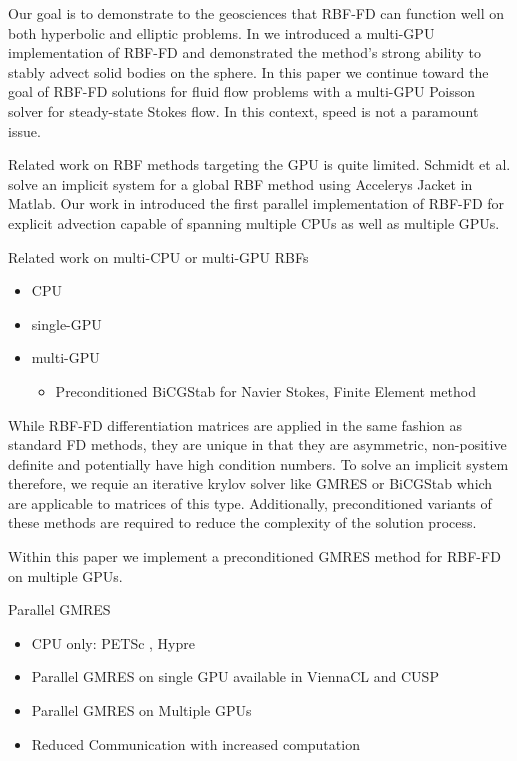 Our goal is to demonstrate to the geosciences that RBF-FD can function well on
both hyperbolic and elliptic problems. In \cite{BolligFlyerErlebacher2012} we
introduced a multi-GPU implementation of RBF-FD and demonstrated the method's
strong ability to stably advect solid bodies on the sphere. In this paper we
continue toward the goal of RBF-FD solutions for fluid flow problems with a
multi-GPU Poisson solver for steady-state Stokes flow. In this context, speed is
not a paramount issue.

Related work on RBF methods targeting the GPU is quite limited. Schmidt et al.
\cite{Schmidt2009b} solve an implicit system for a global RBF method using
Accelerys Jacket in Matlab. Our work in \cite{BolligFlyerErlebacher2012} introduced the first
parallel implementation of RBF-FD for explicit advection capable of spanning
multiple CPUs as well as multiple GPUs. 

Related work on multi-CPU or multi-GPU RBFs
\begin{itemize} 
	\item CPU \cite{Yokota2010} \cite{Wildemann2009}
	\item single-GPU \cite{Schmidt2009b}
	\item multi-GPU 
	\begin{itemize} 
	\item Preconditioned BiCGStab for Navier Stokes, Finite Element method \cite{Goeddeke2009a} 
	\end{itemize} 
\end{itemize} 

While RBF-FD differentiation matrices are applied in the same fashion as standard FD methods, they are unique in that they are asymmetric, non-positive definite and potentially have high condition numbers. To solve an implicit system therefore, we requie an iterative krylov solver like GMRES or BiCGStab which are applicable to matrices of this type. Additionally, preconditioned variants of these methods are required to reduce the complexity of the solution process. 

Within this paper we implement a preconditioned GMRES method for RBF-FD on multiple GPUs. 

Parallel GMRES
\begin{itemize} 
	\item CPU only: PETSc \cite{Yokota2010}, Hypre \cite{Wildemann2009} 
	\item Parallel GMRES on single GPU available in ViennaCL \cite{Rupp2010} and CUSP \cite{Cusp2012}
	\item Parallel GMRES on Multiple GPUs \cite{Bahi2011}
	\item Reduced Communication with increased computation \cite{Dekker2000}
\end{itemize} 

